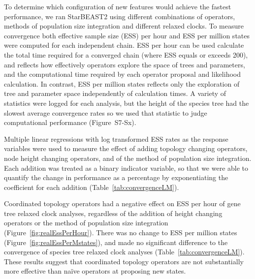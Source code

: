 \documentclass[12pt]{article}
\begin{document}
To determine which configuration of new features would achieve the fastest
performance, we ran StarBEAST2 using different combinations of operators,
methods of population size integration and different relaxed clocks. To measure
convergence both effective sample size (ESS) per hour and ESS per million states
were computed for each independent chain. ESS per hour can be used calculate the
total time required for a converged chain (where ESS equals or exceeds 200), and
reflects how effectively operators explore the space of trees and parameters,
and the computational time required by each operator proposal and likelihood
calculation. In contrast, ESS per million states reflects only the exploration
of tree and parameter space independently of calculation times. A variety of
statistics were logged for each analysis, but the height of the species tree had
the slowest average convergence rates so we used that statistic to judge
computational performance (Figure~S7-Sx).

Multiple linear regressions with log transformed ESS rates as the response
variables were used to measure the effect of adding topology changing operators,
node height changing operators, and of the method of population size
integration. Each addition was treated as a binary indicator variable, so that
we were able to quantify the change in performance as a percentage by
exponentiating the coefficient for each addition
(Table~\ref{tab:convergenceLM}).

Coordinated topology operators had a negative effect on ESS per hour of gene
tree relaxed clock analyses, regardless of the addition of height changing
operators or the method of population size integration
(Figure~\ref{fig:realEssPerHour}). There was no change to ESS per million states
(Figure~\ref{fig:realEssPerMstates}), and made no significant difference to the
convergence of species tree relaxed clock analyses
(Table~\ref{tab:convergenceLM}). These results suggest that coordinated topology
operators are not substantially more effective than na\"ive operators at
proposing new states.
\end{document}
